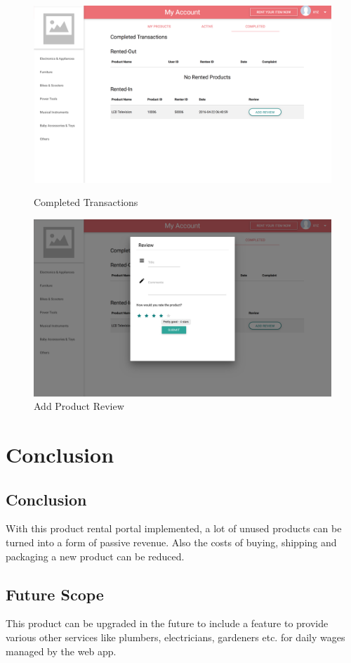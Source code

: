 \documentclass[11pt]{report}
\begin{document}
    \begin{figure}[h]
  \centering
    \includegraphics[width=6in]{completed.png} 
	\caption{Completed Transactions}
\vspace{0.5in}
  \centering
    \includegraphics[width=6in]{addreview.png} 
	\caption{Add Product Review}
	\end{figure}


\chapter{Conclusion}
\label {con}
\section{Conclusion}
With this product rental portal implemented, a lot of unused products can be turned into a form of passive revenue. Also the costs of buying, shipping and packaging a new product can be reduced.
\section{Future Scope}
This product can be upgraded in the future to include a feature to provide various other services like plumbers, electricians, gardeners etc. for daily wages managed by the web app.
\end{document}
